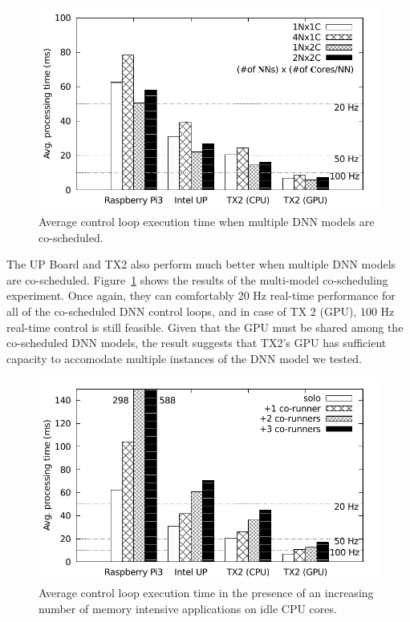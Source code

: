 \begin{figure}[h]
  \centering
  \includegraphics[width=.45\textwidth]{figs/compare_model}
  \caption{Average control loop execution time when multiple DNN
    models are co-scheduled. }
  \label{fig:sys_model}
\end{figure}

The UP Board and TX2 also perform much better when multiple DNN models
are co-scheduled. Figure~\ref{fig:sys_model} shows the results of the
multi-model co-scheduling experiment. Once again, they can comfortably
20 Hz real-time performance for all of the co-scheduled DNN control
loops, and in case of TX 2 (GPU), 100 Hz real-time control is still
feasible. Given that the GPU must be shared among the co-scheduled DNN
models, the result suggests that TX2's GPU has sufficient capacity to
accomodate multiple instances of the DNN model we tested.


\begin{figure}[h]
  \centering
  \includegraphics[width=.45\textwidth]{figs/compare_benchmark}
  \caption{Average control loop execution time in the presence of an
    increasing number of memory intensive applications on idle CPU cores.}
  \label{fig:sys_bench}
\end{figure} 

